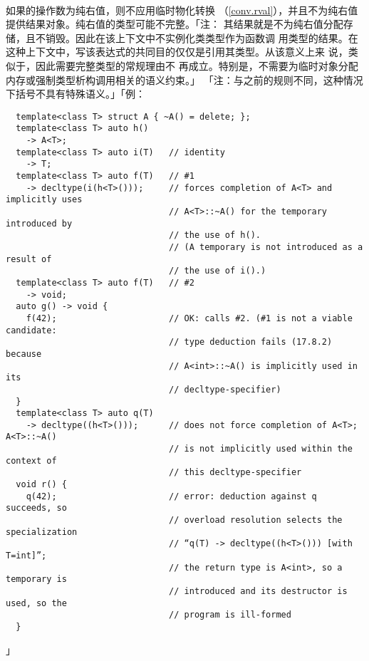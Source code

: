 \paragraph{}
如果的操作数为纯右值，则不应用临时物化转换
（\ref{conv.rval}），并且不为纯右值提供结果对象。纯右值的类型可能不完整。「注：
其结果就是不为纯右值分配存储，且不销毁。因此在该上下文中不实例化类类型作为函数调
用类型的结果。在这种上下文中，写该表达式的共同目的仅仅是引用其类型。从该意义上来
说，类似于，因此需要完整类型的常规理由不
再成立。特别是，不需要为临时对象分配内存或强制类型析构调用相关的语义约束。」
「注：与之前的规则不同，这种情况下括号不具有特殊语义。」「例：
\begin{lstlisting}
  template<class T> struct A { ~A() = delete; };
  template<class T> auto h()
    -> A<T>;
  template<class T> auto i(T)   // identity
    -> T;
  template<class T> auto f(T)   // #1
    -> decltype(i(h<T>()));     // forces completion of A<T> and implicitly uses
                                // A<T>::~A() for the temporary introduced by
                                // the use of h().
                                // (A temporary is not introduced as a result of
                                // the use of i().)
  template<class T> auto f(T)   // #2
    -> void;
  auto g() -> void {
    f(42);                      // OK: calls #2. (#1 is not a viable candidate:
                                // type deduction fails (17.8.2) because
                                // A<int>::~A() is implicitly used in its
                                // decltype-specifier)
  }
  template<class T> auto q(T)
    -> decltype((h<T>()));      // does not force completion of A<T>; A<T>::~A()
                                // is not implicitly used within the context of
                                // this decltype-specifier
  void r() {
    q(42);                      // error: deduction against q succeeds, so
                                // overload resolution selects the specialization
                                // “q(T) -> decltype((h<T>())) [with T=int]”;
                                // the return type is A<int>, so a temporary is
                                // introduced and its destructor is used, so the
                                // program is ill-formed
  }
\end{lstlisting}」



